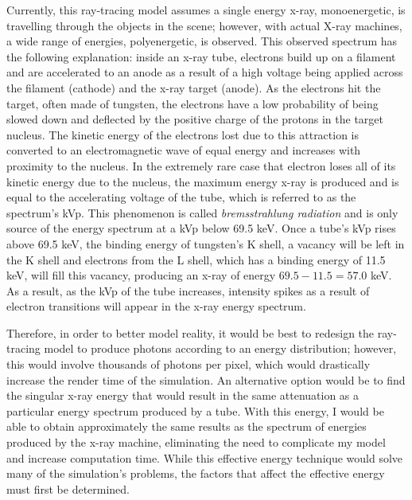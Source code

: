 Currently, this ray-tracing model assumes a single energy x-ray, monoenergetic, is travelling through the objects in the scene; however, with actual X-ray machines, a wide range of energies, polyenergetic, is observed. This observed spectrum has the following explanation: inside an x-ray tube, electrons build up on a filament and are accelerated to an anode as a result of a high voltage being applied across the filament (cathode) and the x-ray target (anode). As the electrons hit the target, often made of tungsten, the electrons have a low probability of being slowed down and deflected by the positive charge of the protons in the target nucleus. The kinetic energy of the electrons lost due to this attraction is converted to an electromagnetic wave of equal energy and increases with proximity to the nucleus. In the extremely rare case that electron loses all of its kinetic energy due to the nucleus, the maximum energy x-ray is produced and is equal to the accelerating voltage of the tube, which is referred to as the spectrum's kVp.  This phenomenon is called \textit{bremsstrahlung radiation} and is only source of the energy spectrum at a kVp below 69.5 keV. Once a tube's kVp rises above 69.5 keV, the binding energy of tungsten's K shell, a vacancy will be left in the K shell and electrons from the L shell, which has a binding energy of 11.5 keV, will fill this vacancy, producing an x-ray of energy $69.5 - 11.5 = 57.0$ keV. As a result, as the kVp of the tube increases, intensity spikes as a result of electron transitions will appear in the x-ray energy spectrum. \cite{Seibert}

Therefore, in order to better model reality, it would be best to redesign the ray-tracing model to produce photons according to an energy distribution; however, this would involve thousands of photons per pixel, which would drastically increase the render time of the simulation. An alternative option would be to find the singular x-ray energy that would result in the same attenuation as a particular energy spectrum produced by a tube. With this energy, I would be able to obtain approximately the same results as the spectrum of energies produced by the x-ray machine, eliminating the need to complicate my model and increase computation time. While this effective energy technique would solve many of the simulation's problems, the factors that affect the effective energy must first be determined.


